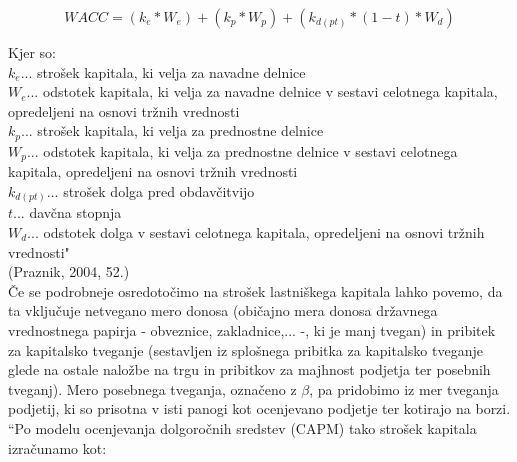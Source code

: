 \documentclass[12pt,a4paper]{amsart}
\theoremstyle{definition} %
\theoremstyle{plain} %
\begin{document}
\begin{equation}
WACC=(k_e * W_e)+(k_p*W_p)+(k_{d(pt)}*(1-t)*W_d)
\end{equation}

Kjer so:\\
$k_e$... strošek kapitala, ki velja za navadne delnice\\
$W_e$... odstotek kapitala, ki velja za navadne delnice v sestavi celotnega kapitala, opredeljeni na osnovi tržnih vrednosti\\
$k_p$... strošek kapitala, ki velja za prednostne delnice\\
$W_p$... odstotek kapitala, ki velja za prednostne delnice v sestavi celotnega kapitala, opredeljeni na osnovi tržnih vrednosti\\
$k_{d(pt)}$... strošek dolga pred obdavčitvijo\\
$t$... davčna stopnja\\
$W_d$... odstotek dolga v sestavi celotnega kapitala, opredeljeni na osnovi tržnih vrednosti"\\
(Praznik, 2004, 52.)\\

Če se podrobneje osredotočimo na strošek lastniškega kapitala lahko povemo, da ta vključuje netvegano mero donosa (običajno mera donosa državnega vrednostnega papirja - obveznice, zakladnice,... -, ki je manj tvegan) in pribitek za kapitalsko tveganje (sestavljen iz splošnega pribitka za kapitalsko tveganje glede na ostale naložbe na trgu in pribitkov za majhnost podjetja ter posebnih tveganj). Mero posebnega tveganja, označeno z $\beta$, pa pridobimo iz mer tveganja podjetij, ki so prisotna v isti panogi kot ocenjevano podjetje ter kotirajo na borzi.\\
``Po modelu ocenjevanja dolgoročnih sredstev (CAPM) tako strošek kapitala izračunamo kot:
\end{document}
